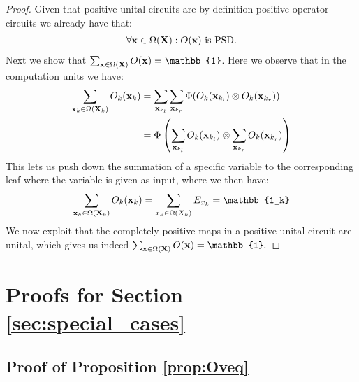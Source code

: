 \begin{proof}
	Given that positive unital circuits are by definition positive operator circuits we already have that:
	\begin{align}
		\forall \mathbf{x} \in \Omega(\mathbf{X}): O(\mathbf{x}) \text{ is PSD}.
	\end{align}
	Next we show that $\sum_{\xvars\in \Omega(\Xvars)} \Ocircuit(\xvars)=\mathbb{1}$. Here we observe that in the computation units we have:
	\begin{align}
		\sum_{\mathbf{x}_k \in \Omega(\mathbf{X}_k)} O_k(\mathbf{x}_k)
		 & = \sum_{\mathbf{x}_{k_l}} \sum_{\mathbf{x}_{k_r}}    \Phi(O_k(\mathbf{x}_{k_l}) \otimes O_k(\mathbf{x}_{k_r})  )
		\\
		 & =
		\Phi \left(
		\sum_{\mathbf{x}_{k_l}}   O_k(\mathbf{x}_{k_l})
		\otimes
		\sum_{\mathbf{x}_{k_r}}O_k(\mathbf{x}_{k_r})
		\nonumber
		\right)
	\end{align}
	This lets us push down the summation of a specific variable to the corresponding leaf where the variable is given as input, where we then have:
	\begin{align}
		\sum_{\xvars_k \in \Omega(\Xvars_k)} \Ocircuit_k(\xvars_k)
		= \sum_{\xvar_k\in \Omega(X_k)} E_{\xvar_k}
		= \mathbb{1_k}
	\end{align}
	We now exploit that the completely positive maps in a positive unital circuit are unital, which gives us indeed
	$
		\sum_{\xvars\in \Omega(\Xvars)} \Ocircuit(\xvars)=\mathbb{1}.
	$
\end{proof}
















\section{Proofs for Section \ref{sec:special_cases}}

\subsection{Proof of Proposition \ref{prop:Oveq}}
\label{sec:proof:prop:Oveq}


\propOveq*

